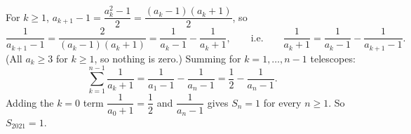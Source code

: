For $k\ge1$, $a_{k+1}-1=\dfrac{a_k^2-1}{2}=\dfrac{(a_k-1)(a_k+1)}{2}$, so
\[\dfrac1{a_{k+1}-1}=\dfrac{2}{(a_k-1)(a_k+1)}=\dfrac1{a_k-1}-\dfrac1{a_k+1},\qquad\text{i.e.}\qquad\dfrac1{a_k+1}=\dfrac1{a_k-1}-\dfrac1{a_{k+1}-1}.\]
(All $a_k\ge3$ for $k\ge1$, so nothing is zero.) Summing for $k=1,\dots,n-1$ telescopes:
\[\sum_{k=1}^{n-1}\dfrac1{a_k+1}=\dfrac1{a_1-1}-\dfrac1{a_n-1}=\dfrac12-\dfrac1{a_n-1}.\]
Adding the $k=0$ term $\dfrac1{a_0+1}=\dfrac12$ and $\dfrac1{a_n-1}$ gives $S_n=1$ for every $n\ge1$. So $S_{2021}=\boxed{1}$.
